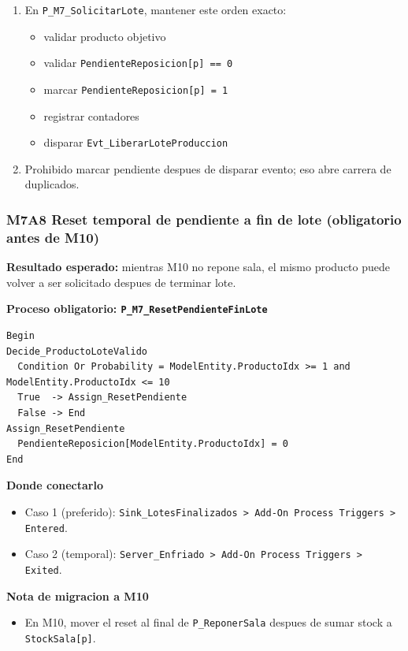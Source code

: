 \documentclass[11pt]{article}
\newcommand{\simio}[1]{\texttt{#1}}
\newcommand{\state}[1]{\texttt{#1}}
\newcommand{\proc}[1]{\texttt{#1}}
\begin{document}
\begin{enumerate}[resume]
  \item En \proc{P\_M7\_SolicitarLote}, mantener este orden exacto:
  \begin{itemize}
    \item validar producto objetivo
    \item validar \state{PendienteReposicion[p] == 0}
    \item marcar \state{PendienteReposicion[p] = 1}
    \item registrar contadores
    \item disparar \simio{Evt\_LiberarLoteProduccion}
  \end{itemize}
  \item Prohibido marcar pendiente despues de disparar evento; eso abre carrera de duplicados.
\end{enumerate}

\subsubsection{M7A8 Reset temporal de pendiente a fin de lote (obligatorio antes de M10)}
\textbf{Resultado esperado:} mientras M10 no repone sala, el mismo producto puede volver a ser solicitado despues de terminar lote.

\textbf{Proceso obligatorio: \proc{P\_M7\_ResetPendienteFinLote}}
\begin{lstlisting}[caption={Bloques cerrados de reset temporal en M7A}]
Begin
Decide_ProductoLoteValido
  Condition Or Probability = ModelEntity.ProductoIdx >= 1 and ModelEntity.ProductoIdx <= 10
  True  -> Assign_ResetPendiente
  False -> End
Assign_ResetPendiente
  PendienteReposicion[ModelEntity.ProductoIdx] = 0
End
\end{lstlisting}

\textbf{Donde conectarlo}
\begin{itemize}
  \item Caso 1 (preferido): \simio{Sink\_LotesFinalizados > Add-On Process Triggers > Entered}.
  \item Caso 2 (temporal): \simio{Server\_Enfriado > Add-On Process Triggers > Exited}.
\end{itemize}

\textbf{Nota de migracion a M10}
\begin{itemize}
  \item En M10, mover el reset al final de \proc{P\_ReponerSala} despues de sumar stock a \state{StockSala[p]}.
\end{itemize}
\end{document}
